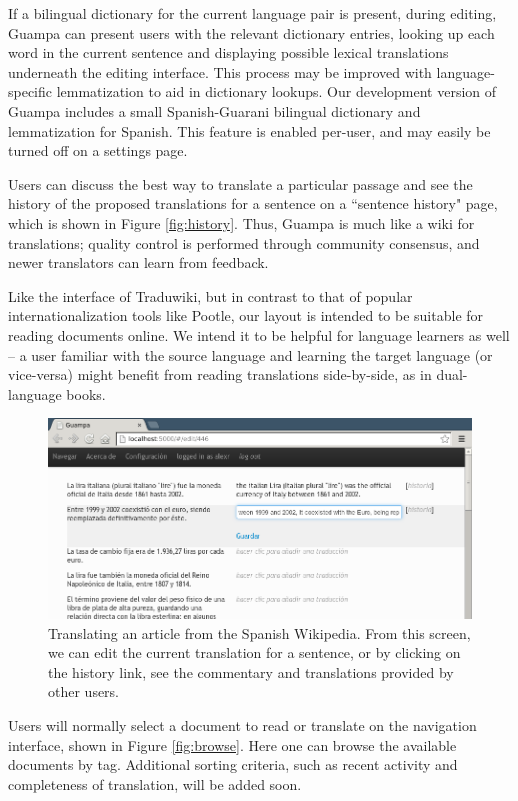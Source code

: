 \documentclass[10pt, a4paper]{article}
\begin{document}
If a bilingual dictionary for the current language pair is present,
during editing, Guampa can present users with the relevant dictionary entries,
looking up each word in the current sentence and displaying possible lexical
translations underneath the editing interface. This process may be improved
with language-specific lemmatization to aid in dictionary lookups. Our
development version of Guampa includes a small Spanish-Guarani bilingual
dictionary and lemmatization for Spanish. This feature is enabled per-user, and
may easily be turned off on a settings page.

Users can discuss the best way to translate a particular passage and see the
history of the proposed translations for a sentence on a ``sentence history"
page, which is shown in Figure \ref{fig:history}.
Thus, Guampa is much like a wiki for translations; quality control is performed
through community consensus, and newer translators can learn from feedback.

Like the interface of Traduwiki, but in contrast to that of popular
internationalization tools like Pootle, our layout is intended to be suitable
for reading documents online. We intend it to be helpful for language learners
as well -- a user familiar with the source language and learning the target
language (or vice-versa) might benefit from reading translations side-by-side,
as in dual-language books.

\begin{figure}
  \begin{center}
\includegraphics[width=12cm]{guampa-edit-cropped}
  \end{center}
\caption{Translating an article from the Spanish Wikipedia. From this screen,
we can edit the current translation for a sentence, or by clicking on the
history link, see the commentary and translations provided by other users.}
\label{fig:translating}
\end{figure}

Users will normally select a document to read or translate on the navigation
interface, shown in Figure \ref{fig:browse}. Here one can browse the available
documents by tag.
Additional sorting criteria, such as recent activity and completeness of
translation, will be added soon.
\end{document}
